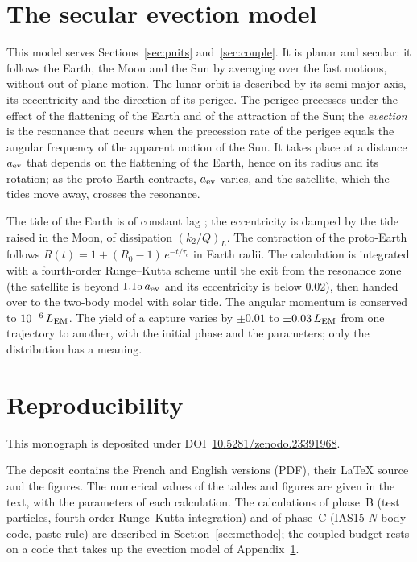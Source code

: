 \documentclass[11pt,a4paper]{article}
\newcommand{\LEM}{\ensuremath{L_{\rm EM}}}
\begin{document}
\appendix
\section{The secular evection model}
\label{app:evec}

This model serves Sections~\ref{sec:puits} and~\ref{sec:couple}. It is planar and secular: it follows the Earth, the Moon and the Sun by averaging over the fast motions, without out-of-plane motion. The lunar orbit is described by its semi-major axis, its eccentricity and the direction of its perigee. The perigee precesses under the effect of the flattening of the Earth and of the attraction of the Sun; the \emph{evection} is the resonance that occurs when the precession rate of the perigee equals the angular frequency of the apparent motion of the Sun. It takes place at a distance $a_{\rm ev}$ that depends on the flattening of the Earth, hence on its radius and its rotation; as the proto-Earth contracts, $a_{\rm ev}$ varies, and the satellite, which the tides move away, crosses the resonance.

The tide of the Earth is of constant lag \citep{Hut1981}; the eccentricity is damped by the tide raised in the Moon, of dissipation $(k_2/Q)_L$. The contraction of the proto-Earth follows $R(t)=1+(R_0-1)\,e^{-t/\tau_c}$ in Earth radii. The calculation is integrated with a fourth-order Runge--Kutta scheme until the exit from the resonance zone (the satellite is beyond $1.15\,a_{\rm ev}$ and its eccentricity is below $0.02$), then handed over to the two-body model with solar tide. The angular momentum is conserved to $10^{-6}\,\LEM$. The yield of a capture varies by $\pm0.01$ to $\pm0.03\,\LEM$ from one trajectory to another, with the initial phase and the parameters; only the distribution has a meaning.

\section{Reproducibility}
\label{app:repro}

This monograph is deposited under DOI~\href{https://doi.org/10.5281/zenodo.23391968}{10.5281/zenodo.23391968}.

The deposit contains the French and English versions (PDF), their \LaTeX{} source and the figures. The numerical values of the tables and figures are given in the text, with the parameters of each calculation. The calculations of phase~B (test particles, fourth-order Runge--Kutta integration) and of phase~C (IAS15 $N$-body code, paste rule) are described in Section~\ref{sec:methode}; the coupled budget rests on a code that takes up the evection model of Appendix~\ref{app:evec}.
\end{document}
